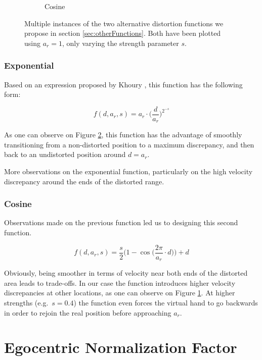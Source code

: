 \begin{figure}[h]
\begin{subfigure}[b]{.45\textwidth}
        \caption{Cosine}
        \label{fig:otherDistortionsCos}
    \end{subfigure}
    \caption{Multiple instances of the two alternative distortion functions we propose in section \ref{sec:otherFunctions}. Both have been plotted using $a_r = 1$, only varying the strength parameter $s$.}
    \label{fig:otherDistortions}
\end{figure}

\subsubsection{Exponential}

Based on an expression proposed by Khoury \cite{khoury2015human}, this function has the following form:

\begin{equation*}
    f(d, a_r, s) = a_r \cdot \Bigg(\frac{d}{a_r}\Bigg)^{2^{-s}}
\end{equation*}

As one can observe on Figure \ref{fig:otherDistortions}, this function has the advantage of smoothly transitioning from a non-distorted position to a maximum discrepancy, and then back to an undistorted position around $d=a_r$.

More observations on the exponential function, particularly on the high velocity discrepancy around the ends of the distorted range.

\subsubsection{Cosine}

Observations made on the previous function led us to designing this second function.

\begin{equation*}
    f(d, a_r, s) = \frac{s}{2}\Bigg(1 - \cos\Big(\frac{2\pi}{a_r} \cdot d\Big)\Bigg) + d
\end{equation*}

Obviously, being smoother in terms of velocity near both ends of the distorted area leads to trade-offs. In our case the function introduces higher velocity discrepancies at other locations, as one can observe on Figure \ref{fig:otherDistortionsCos}. At higher strengths (e.g.\ $s=0.4$) the function even forces the virtual hand to go backwards in order to rejoin the real position before approaching $a_r$.

\section{Egocentric Normalization Factor}

